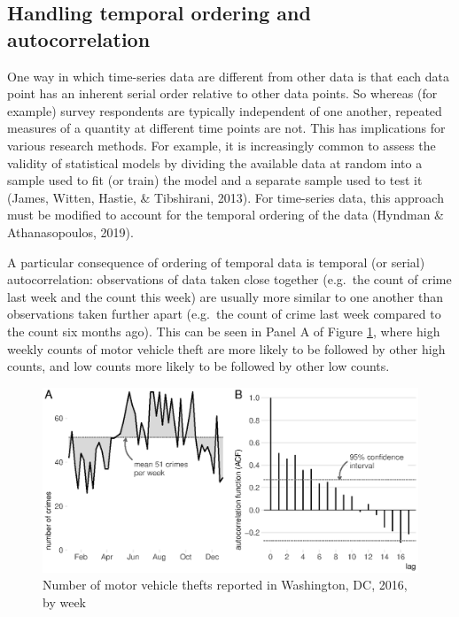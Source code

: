 \documentclass[
  english,
  man,a4paper,mask,floatsintext]{apa6}
\begin{document}
\hypertarget{handling-temporal-ordering-and-autocorrelation}{%
\subsection{Handling temporal ordering and autocorrelation}\label{handling-temporal-ordering-and-autocorrelation}}

One way in which time-series data are different from other data is that each data point has an inherent serial order relative to other data points. So whereas (for example) survey respondents are typically independent of one another, repeated measures of a quantity at different time points are not. This has implications for various research methods. For example, it is increasingly common to assess the validity of statistical models by dividing the available data at random into a sample used to fit (or train) the model and a separate sample used to test it (James, Witten, Hastie, \& Tibshirani, 2013). For time-series data, this approach must be modified to account for the temporal ordering of the data (Hyndman \& Athanasopoulos, 2019).

A particular consequence of ordering of temporal data is temporal (or serial) autocorrelation: observations of data taken close together (e.g.~the count of crime last week and the count this week) are usually more similar to one another than observations taken further apart (e.g.~the count of crime last week compared to the count six months ago). This can be seen in Panel A of Figure \ref{fig:autocorrelation}, where high weekly counts of motor vehicle theft are more likely to be followed by other high counts, and low counts more likely to be followed by other low counts.

\begin{figure}
\centering
\includegraphics{figure_14-4.eps}
\caption{\label{fig:autocorrelation}Number of motor vehicle thefts reported in Washington, DC, 2016, by week}
\end{figure}
\end{document}
